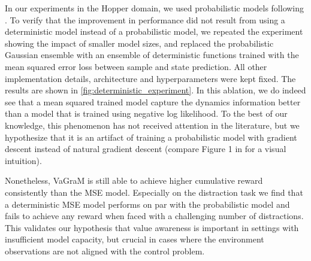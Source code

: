 In our experiments in the Hopper domain, we used probabilistic models following \textcite{janner2019mbpo}. 
To verify that the improvement in performance did not result from using a deterministic model instead of a probabilistic model, we repeated the experiment showing the impact of smaller model sizes, and replaced the probabilistic Gaussian ensemble with an ensemble of deterministic functions trained with the mean squared error loss between sample and state prediction.
All other implementation details, architecture and hyperparameters were kept fixed. The results are shown in \autoref{fig:deterministic_experiment}.
In this ablation, we do indeed see that a mean squared trained model capture the dynamics information better than a model that is trained using negative log likelihood.
To the best of our knowledge, this phenomenon has not received attention in the literature, but we hypothesize that it is an artifact of training a probabilistic model with gradient descent instead of natural gradient descent (compare Figure 1 in \textcite{peters2008natural} for a visual intuition).

Nonetheless, VaGraM is still able to achieve higher cumulative reward consistently than the MSE model. 
Especially on the distraction task we find that a deterministic MSE model performs on par with the probabilistic model and fails to achieve any reward when faced with a challenging number of distractions. 
This validates our hypothesis that value awareness is important in settings with insufficient model capacity, but crucial in cases where the environment observations are not aligned with the control problem.

